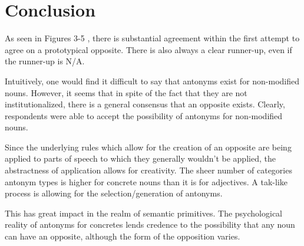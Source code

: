 \section {Conclusion}
As seen in Figures 3-5%
, there is substantial agreement within the first attempt to agree on a prototypical opposite.  There is also always a clear runner-up, even if the runner-up is N/A.  

Intuitively, one would find it difficult to say that antonyms exist for non-modified nouns.  However, it seems that in spite of the fact that they are not institutionalized, there is a general consensus that an opposite exists.  Clearly, respondents were able to accept the possibility of antonyms for non-modified nouns. 

Since the underlying rules which allow for the creation of an opposite are being applied to parts of speech to which they generally wouldn’t be applied, the abstractness of application allows for creativity.  The sheer number of categories antonym types is higher for concrete nouns than it is for adjectives.  A tak-like process is allowing for the selection/generation of antonyms.

This has great impact in the realm of semantic primitives.  The psychological reality of antonyms for concretes lends credence to the possibility that any noun can have an opposite, although the form of the opposition varies.

